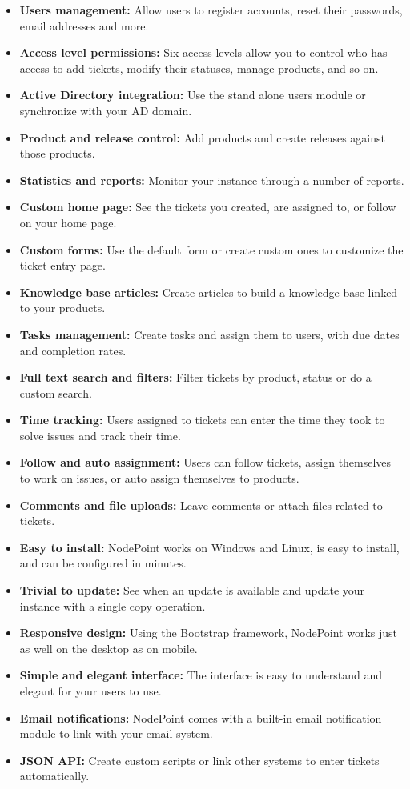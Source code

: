 \documentclass[11pt]{article}
\begin{document}
\begin{itemize}
\item \textbf{Users management:}  Allow users to register accounts, reset their passwords, email addresses and more.
\item \textbf{Access level permissions:} Six access levels allow you to control who has access to add tickets, modify their statuses, manage products, and so on.
\item \textbf{Active Directory integration:} Use the stand alone users module or synchronize with your AD domain.
\item \textbf{Product and release control:} Add products and create releases against those products.
\item \textbf{Statistics and reports:} Monitor your instance through a number of reports.
\item \textbf{Custom home page:} See the tickets you created, are assigned to, or follow on your home page.
\item \textbf{Custom forms:} Use the default form or create custom ones to customize the ticket entry page.
\item \textbf{Knowledge base articles:} Create articles to build a knowledge base linked to your products.
\item \textbf{Tasks management:} Create tasks and assign them to users, with due dates and completion rates.
\item \textbf{Full text search and filters:} Filter tickets by product, status or do a custom search.
\item \textbf{Time tracking:} Users assigned to tickets can enter the time they took to solve issues and track their time.
\item \textbf{Follow and auto assignment:} Users can follow tickets, assign themselves to work on issues, or auto assign themselves to products.
\item \textbf{Comments and file uploads:} Leave comments or attach files related to tickets.
\item \textbf{Easy to install:} NodePoint works on Windows and Linux, is easy to install, and can be configured in minutes.
\item \textbf{Trivial to update:} See when an update is available and update your instance with a single copy operation.
\item \textbf{Responsive design:} Using the Bootstrap framework, NodePoint works just as well on the desktop as on mobile.
\item \textbf{Simple and elegant interface:} The interface is easy to understand and elegant for your users to use.
\item \textbf{Email notifications:} NodePoint comes with a built-in email notification module to link with your email system.
\item \textbf{JSON API:} Create custom scripts or link other systems to enter tickets automatically.
\end{itemize}
\end{document}
